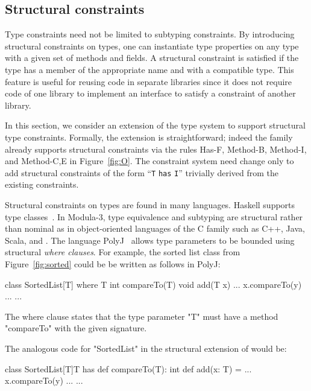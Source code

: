 \subsection{Structural constraints}
\label{sec:structural}
\label{sec:structural-typing}

Type constraints need not be limited to subtyping constraints.
By introducing structural constraints on types, one can
instantiate
type properties on any type with a given set
of methods and fields.
A structural constraint is satisfied if the type has a member of
the appropriate name and with a compatible type.
This feature is useful for reusing code
in separate libraries since it does not require
code of one library to implement an interface to satisfy a
constraint of another library.

In this section, we consider an extension of the \Xten{} type system
to support structural type constraints.  Formally, the extension
is straightforward; indeed the \FX{} family already supports structural constraints
via the rules {\sc Has-F},
{\sc Method-B},
{\sc Method-I},
and
{\sc Method-C,E} in Figure~\ref{fig:O}.
The constraint system need change only to add 
structural
constraints of the form ``{\tt T} {\tt has} {\tt I}''
trivially derived from the existing constraints.

Structural constraints on types are found in many languages.
Haskell supports type
classes~\cite{haskell,haskell-type-classes}.
In Modula-3, type equivalence and subtyping are structural
rather than nominal as in object-oriented languages of the C
family such as C++, Java, Scala, and \Xten{}.
%
The language PolyJ~\cite{java-popl97} allows type parameters to be
bounded using
structural \emph{where clauses}.
For example, the sorted list class from Figure~\ref{fig:sorted}
could be
be written as follows in PolyJ:
{\footnotesize
\begin{xten}
class SortedList[T] where T {int compareTo(T)} {
    void add(T x) { ... x.compareTo(y) ... }
    ...
}
\end{xten}}
The where clause states that the type parameter \xcd"T" must have a
method \xcd"compareTo" with the given signature.

The analogous code for \xcd"SortedList" in the structural
extension of \Xten{} would be:
\begin{xten}
class SortedList[T]{T has def compareTo(T): int} {
    def add(x: T) = { ... x.compareTo(y) ... }
    ...
}
\end{xten}

